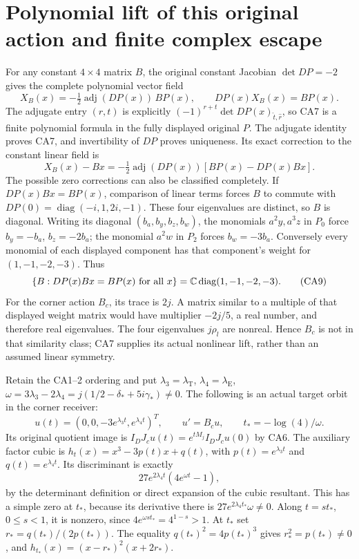 \section{Polynomial lift of this original action and finite complex escape}
For any constant $4\times4$ matrix $B$, the original constant
Jacobian $\det DP=-2$ gives the complete polynomial vector field
\[
 X_B(x)=-\tfrac12\operatorname{adj}(DP(x))\,BP(x),\qquad
 DP(x)X_B(x)=BP(x). \tag{CA7}
\]
The adjugate entry $(r,t)$ is explicitly
$(-1)^{r+t}\det DP(x)_{\widehat t,\widehat r}$, so CA7 is a
finite polynomial formula in the fully displayed original $P$.
The adjugate identity proves CA7, and invertibility of $DP$
proves uniqueness. Its exact correction to the constant linear
field is
\[
 X_B(x)-Bx=-\tfrac12\operatorname{adj}(DP(x))
                         [BP(x)-DP(x)Bx]. \tag{CA8}
\]
The possible zero corrections can also be classified completely.
If $DP(x)Bx=BP(x)$, comparison of linear terms forces $B$ to
commute with $DP(0)=\operatorname{diag}(-i,1,2i,-1)$.
These four eigenvalues are distinct, so $B$ is diagonal.
Writing its diagonal $(b_a,b_y,b_z,b_w)$, the monomials
$a^2y,a^3z$ in $P_0$ force $b_y=-b_a$, $b_z=-2b_a$;
the monomial $a^2w$ in $P_2$ forces $b_w=-3b_a$.
Conversely every monomial of each displayed component has
that component's weight for $(1,-1,-2,-3)$. Thus
\[
 \{B:DP(x)Bx=BP(x)\text{ for all }x\}
       =\mathbb C\operatorname{diag}(1,-1,-2,-3). \tag{CA9}
\]
For the corner action $B_c$, its trace is $2j$. A matrix
similar to a multiple of that displayed weight matrix would
have multiplier $-2j/5$, a real number, and therefore real
eigenvalues. The four eigenvalues $j\rho_l$ are nonreal.
Hence $B_c$ is not in that similarity class; CA7 supplies its
actual nonlinear lift, rather than an assumed linear symmetry.

Retain the CA1--2 ordering and put $\lambda_3=\lambda_\mathrm T$,
$\lambda_4=\lambda_\mathrm E$,
$\omega=3\lambda_3-2\lambda_4
=j(1/2-\delta_*+5i\gamma_*)\ne0$.
The following is an actual target orbit in the corner receiver:
\[
 u(t)=(0,0,-3e^{\lambda_3t},e^{\lambda_4t})^T,\qquad
 u'=B_cu,\qquad
 t_*=-\log(4)/\omega. \tag{CA10}
\]
Its original quotient image is $I_DJ_cu(t)=
e^{tM_j}I_DJ_cu(0)$ by CA6. The auxiliary factor cubic is
$h_t(x)=x^3-3p(t)x+q(t)$, with
$p(t)=e^{\lambda_3t}$ and $q(t)=e^{\lambda_4t}$.
Its discriminant is exactly
\[
 27e^{2\lambda_4t}(4e^{\omega t}-1), \tag{CA11}
\]
by the determinant definition or direct expansion of the cubic
resultant. This has a simple zero at $t_*$, because its
derivative there is $27e^{2\lambda_4t_*}\omega\ne0$.
Along $t=st_*$, $0\le s<1$, it is nonzero, since
$4e^{\omega st_*}=4^{1-s}>1$.
At $t_*$ set $r_*=q(t_*)/(2p(t_*))$. The equality
$q(t_*)^2=4p(t_*)^3$ gives $r_*^2=p(t_*)\ne0$,
and $h_{t_*}(x)=(x-r_*)^2(x+2r_*)$.


